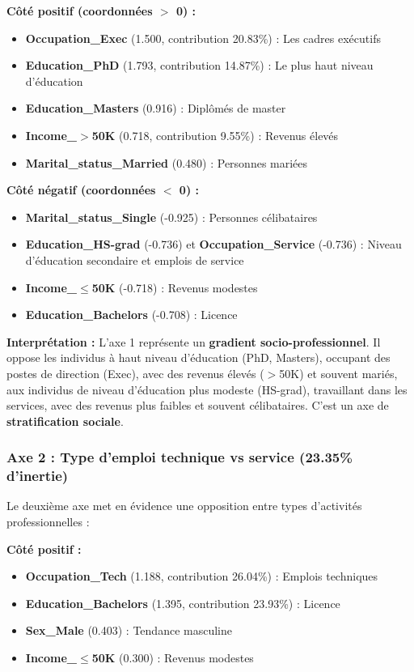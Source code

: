 \documentclass[12pt,a4paper]{article}
\begin{document}
\textbf{Côté positif (coordonnées $>$ 0) :}
\begin{itemize}
    \item \textbf{Occupation\_Exec} (1.500, contribution 20.83\%) : Les cadres exécutifs
    \item \textbf{Education\_PhD} (1.793, contribution 14.87\%) : Le plus haut niveau d'éducation
    \item \textbf{Education\_Masters} (0.916) : Diplômés de master
    \item \textbf{Income\_$>$50K} (0.718, contribution 9.55\%) : Revenus élevés
    \item \textbf{Marital\_status\_Married} (0.480) : Personnes mariées
\end{itemize}

\textbf{Côté négatif (coordonnées $<$ 0) :}
\begin{itemize}
    \item \textbf{Marital\_status\_Single} (-0.925) : Personnes célibataires
    \item \textbf{Education\_HS-grad} (-0.736) et \textbf{Occupation\_Service} (-0.736) : Niveau d'éducation secondaire et emplois de service
    \item \textbf{Income\_$\leq$50K} (-0.718) : Revenus modestes
    \item \textbf{Education\_Bachelors} (-0.708) : Licence
\end{itemize}

\textbf{Interprétation :} L'axe 1 représente un \textbf{gradient socio-professionnel}. Il oppose les individus à haut niveau d'éducation (PhD, Masters), occupant des postes de direction (Exec), avec des revenus élevés ($>$50K) et souvent mariés, aux individus de niveau d'éducation plus modeste (HS-grad), travaillant dans les services, avec des revenus plus faibles et souvent célibataires. C'est un axe de \textbf{stratification sociale}.

\subsubsection{Axe 2 : Type d'emploi technique vs service (23.35\% d'inertie)}

Le deuxième axe met en évidence une opposition entre types d'activités professionnelles :

\textbf{Côté positif :}
\begin{itemize}
    \item \textbf{Occupation\_Tech} (1.188, contribution 26.04\%) : Emplois techniques
    \item \textbf{Education\_Bachelors} (1.395, contribution 23.93\%) : Licence
    \item \textbf{Sex\_Male} (0.403) : Tendance masculine
    \item \textbf{Income\_$\leq$50K} (0.300) : Revenus modestes
\end{itemize}
\end{document}

